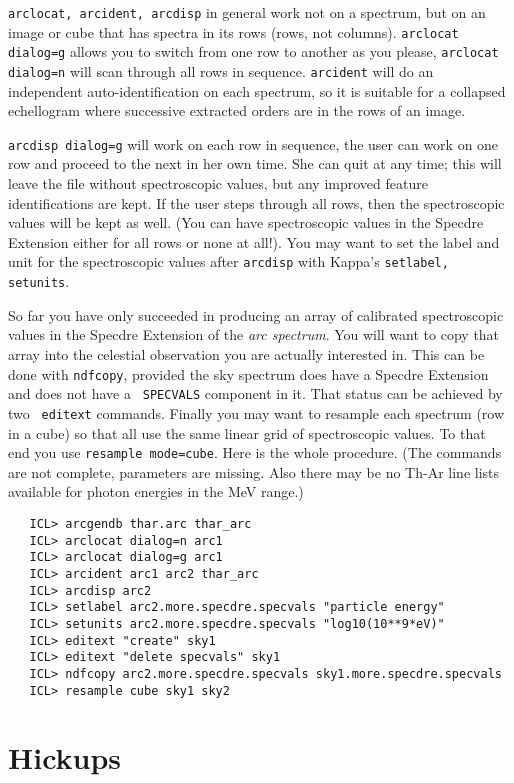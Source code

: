 {\tt arclocat, arcident, arcdisp} in general work not on a spectrum, but
on an image or cube that has spectra in its rows (rows, not columns).
{\tt arclocat dialog=g} allows you to switch from one row to another as
you please, {\tt arclocat dialog=n} will scan through all rows in
sequence.  {\tt arcident} will do an independent auto-identification on
each spectrum, so it is suitable for a collapsed echellogram where
successive extracted orders are in the rows of an image.

{\tt arcdisp dialog=g} will work on each row in sequence, the user can
work on one row and proceed to the next in her own time.  She can quit
at any time; this will leave the file without spectroscopic values, but
any improved feature identifications are kept.  If the user steps
through all rows, then the spectroscopic values will be kept as well.
(You can have spectroscopic values in the Specdre Extension either for
all rows or none at all!).  You may want to set the label and unit for
the spectroscopic values after {\tt arcdisp} with Kappa's {\tt setlabel,
setunits}.

So far you have only succeeded in producing an array of calibrated
spectroscopic values in the Specdre Extension of the {\it arc spectrum}.
You will want to copy that array into the celestial observation you are
actually interested in.  This can be done with {\tt ndfcopy}, provided
the sky spectrum does have a Specdre Extension and does not have a {\tt
SPECVALS} component in it.  That status can be achieved by two {\tt
editext} commands.  Finally you may want to resample each spectrum (row
in a cube) so that all use the same linear grid of spectroscopic values.
To that end you use {\tt resample mode=cube}.  Here is the whole
procedure.  (The commands are not complete, parameters are missing.  Also
there may be no Th-Ar line lists available for photon energies in the
MeV range.)

\begin{verbatim}
   ICL> arcgendb thar.arc thar_arc
   ICL> arclocat dialog=n arc1
   ICL> arclocat dialog=g arc1
   ICL> arcident arc1 arc2 thar_arc
   ICL> arcdisp arc2
   ICL> setlabel arc2.more.specdre.specvals "particle energy"
   ICL> setunits arc2.more.specdre.specvals "log10(10**9*eV)"
   ICL> editext "create" sky1
   ICL> editext "delete specvals" sky1
   ICL> ndfcopy arc2.more.specdre.specvals sky1.more.specdre.specvals
   ICL> resample cube sky1 sky2
\end{verbatim}


\goodbreak
\section{Hickups}
\label{hickup}

